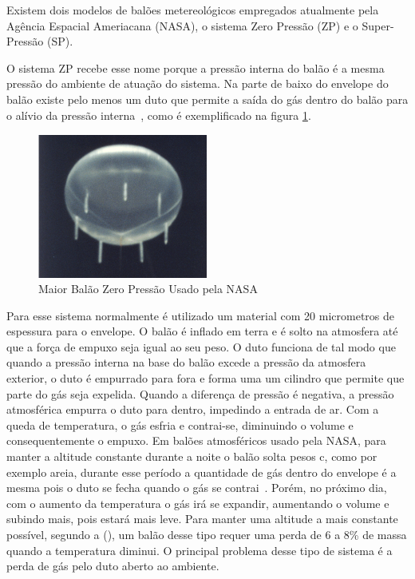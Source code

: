 	Existem dois modelos de balões metereológicos empregados atualmente pela Agência Espacial Ameriacana (NASA), o sistema Zero Pressão (ZP) e o Super-Pressão (SP).

	O sistema ZP recebe esse nome porque a pressão interna do balão é a mesma  pressão do ambiente de atuação do sistema. Na parte de baixo do envelope do balão existe pelo menos um duto que permite a saída do gás dentro do balão para o alívio da pressão interna~\cite{nasa3}, como é exemplificado na figura \ref{img:maiorBalaoZeroPressao}.

	\begin{figure}[H]
		\centering
		\includegraphics[width=0.5\textwidth]{figuras/maiorBalaoZeroPressao}
		\caption[Maior Balão Zero Pressão Usado pela NASA]{Maior Balão Zero Pressão Usado pela NASA~\cite{nasa1}}
		\label{img:maiorBalaoZeroPressao}
	\end{figure}

	Para esse sistema normalmente é utilizado um material com 20 micrometros de espessura para o envelope. O balão é inflado em terra e é solto na atmosfera até que a força de empuxo seja igual ao seu peso. O duto funciona de tal modo que quando a pressão interna na base do balão excede a pressão da atmosfera exterior, o duto é empurrado para fora e forma uma um cilindro que permite que parte do gás seja expelida. Quando a diferença de pressão é negativa, a pressão atmosférica empurra o duto para dentro, impedindo a entrada de ar. Com a queda de temperatura, o gás esfria e contrai-se, diminuindo o volume e consequentemente o empuxo. Em balões atmosféricos usado pela NASA, para manter a altitude constante durante a noite o balão solta pesos c, como por exemplo areia, durante esse período a quantidade de gás dentro do envelope é a mesma pois o duto se fecha quando o gás se contrai~\cite{eoss}. Porém, no próximo dia, com o aumento da temperatura o gás irá se expandir, aumentando o volume e subindo mais, pois estará mais leve. Para manter uma altitude a mais constante possível, segundo a  (\citeyear{nasa3}), um balão desse tipo requer uma perda de 6 a 8\% de massa quando a temperatura diminui. O principal problema desse tipo de sistema é a perda de gás pelo duto aberto ao ambiente.

